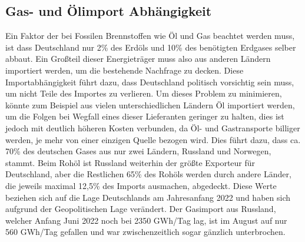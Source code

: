 \documentclass[a4paper,12pt]{scrartcl}
\begin{document}
\subsection{Gas- und Ölimport Abhängigkeit}
\label{gas-und-öl-abhängigkeit}
Ein Faktor der bei Fossilen Brennstoffen wie Öl und Gas beachtet werden muss, ist dass Deutschland nur 2\% des Erdöls und 10\% des benötigten Erdgases selber abbaut. Ein Großteil dieser Energieträger muss also aus anderen Ländern importiert werden, um die bestehende Nachfrage zu decken. Diese Importabhängigkeit führt dazu, dass Deutschland politisch vorsichtig sein muss, um nicht Teile des Importes zu verlieren. Um dieses Problem zu minimieren, könnte zum Beispiel aus vielen unterschiedlichen Ländern Öl importiert werden, um die Folgen bei Wegfall eines dieser Lieferanten geringer zu halten, dies ist jedoch mit deutlich höheren Kosten verbunden, da Öl- und Gastransporte billiger werden, je mehr von einer einzigen Quelle bezogen wird. Dies führt dazu, dass ca. 70\% des deutschen Gases aus nur zwei Ländern, Russland und Norwegen, stammt. Beim Rohöl ist Russland weiterhin der größte Exporteur für Deutschland, aber die Restlichen 65\% des Rohöls werden durch andere Länder, die jeweils maximal 12,5\% des Imports ausmachen, abgedeckt. 
Diese Werte beziehen sich auf die Lage Deutschlands am Jahresanfang 2022 und haben sich aufgrund der Geopolitischen Lage verändert. Der Gasimport aus Russland, welcher Anfang Juni 2022 noch bei 2350 GWh/Tag lag, ist im August auf nur 560 GWh/Tag gefallen und war zwischenzeitlich sogar gänzlich unterbrochen.
\end{document}

